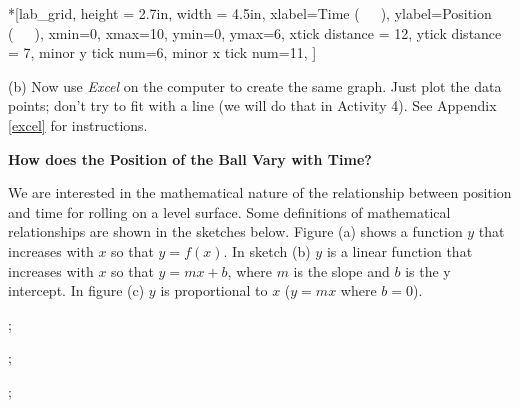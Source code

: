 \begin{lab_axis}*[lab_grid,
	height = 2.7in, width = 4.5in,
	xlabel={Time (~~~)},
	ylabel={Position (~~~)},
	xmin=0, xmax=10,
	ymin=0, ymax=6,
	xtick distance = 12,  %
	ytick distance = 7,
	minor y tick num=6,
	minor x tick num=11,
	]
\end{lab_axis}

(b) Now use \textit{Excel} on the computer to create the same graph. Just plot the 
data points; don't try to fit with a line (we will do that in Activity 4). 
See Appendix \ref{excel} for instructions.

\textbf{How does the Position of the Ball Vary with Time?} 

We are interested in the mathematical nature of the relationship between position
and time for rolling on a level surface. Some definitions of mathematical relationships
are shown in the sketches below. Figure (a) shows a function $y$ that increases
with $x$ so that $y = f(x)$. 
In sketch (b) $y$ is a linear function that increases
with $x$ so that $y = mx + b$, where 
$m$ is the slope and $b$ is the y intercept. In
figure (c) $y$ is proportional to $x$ ($y = mx$ where $b = 0$).

\begin{center}
\begin{lab_axis}[lab_noticks_4quads,
	height = {1.7in}, width = {1.7in},
	xlabel={$x$},
	ylabel={$y$},
	title={(a)},
	]
;
\end{lab_axis}
\hspace{0.2in}
\begin{lab_axis}[lab_noticks_4quads,
	height = {1.7in}, width = {1.7in},
	xlabel={$x$},
	ylabel={$y$},
	title={(b)},
	]
;
\end{lab_axis}
\hspace{0.2in}
\begin{lab_axis}[lab_noticks_4quads,
	height = {1.7in}, width = {1.7in},
	xlabel={$x$},
	ylabel={$y$},
	title={(c)},
	]
;
\end{lab_axis}
\end{center}


